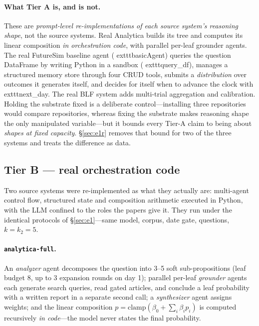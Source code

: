 \documentclass[10pt]{article}
\newcommand{\hr}[1]{\texttt{#1}}
\begin{document}
\paragraph{What Tier A is, and is not.} These are \emph{prompt-level re-implementations of each
source system's reasoning shape}, not the source systems. Real Analytica builds its tree and
computes its linear composition \emph{in orchestration code}, with parallel per-leaf grounder
agents. The real FutureSim baseline agent (	exttt{basicAgent}) queries the question DataFrame by
writing Python in a sandbox (	exttt{query\_df}), manages a structured memory store through
four CRUD tools, submits a \emph{distribution} over outcomes it generates itself, and decides
for itself when to advance the clock with 	exttt{next\_day}. The real BLF system adds multi-trial aggregation and calibration. Holding the
substrate fixed is a deliberate control---installing three repositories would compare
repositories, whereas fixing the substrate makes reasoning shape the only manipulated
variable---but it bounds every Tier-A claim to being about \emph{shapes at fixed capacity}.
\S\ref{sec:e1r} removes that bound for two of the three systems and treats the difference as data.

\subsection{Tier B --- real orchestration code}\label{sec:tierB}
Two source systems were re-implemented as what they actually are: multi-agent control flow,
structured state and composition arithmetic executed in Python, with the LLM confined to the
roles the papers give it. They run under the identical protocols of \S\ref{sec:e1}---same model,
corpus, date gate, questions, $k{=}k_2{=}5$.

\paragraph{\hr{analytica-full}.} An \emph{analyzer} agent decomposes the question into 3--5 soft
sub-propositions (leaf budget 8, up to 3 expansion rounds on day 1); parallel per-leaf
\emph{grounder} agents each generate search queries, read gated articles, and conclude a leaf
probability with a written report in a separate second call; a \emph{synthesizer} agent assigns
weights; and the linear composition $p=\mathrm{clamp}(\beta_0+\sum_i\beta_i p_i)$ is computed
recursively \emph{in code}---the model never states the final probability.
\end{document}
